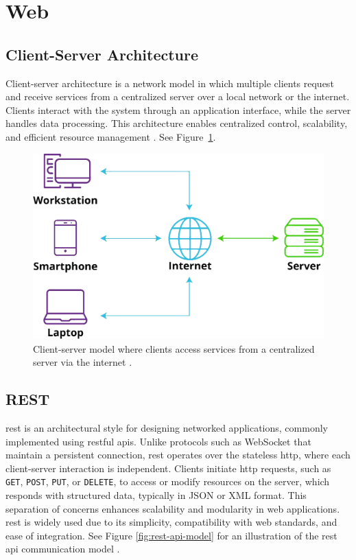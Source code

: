 \section{Web}
\label{sec:web}

\subsection{Client-Server Architecture}
\label{subsec:client-server}

Client-server architecture is a network model in which multiple clients request and receive services from a centralized server over a local network or the internet. Clients interact with the system through an application interface, while the server handles data processing. This architecture enables centralized control, scalability, and efficient resource management \cite{liquidweb:client-server}. See Figure~\ref{fig:client-server-architecture}.

\begin{figure}[h!]
    \centering
    \includegraphics[width=0.75\linewidth]{figures/theory/client-server-architecture.png}
    \caption[Client-server architecture]{Client-server model where clients access services from a centralized server via the internet \cite{liquidweb:client-server}.}
    \label{fig:client-server-architecture}
\end{figure}

\subsection{REST}

\gls{rest} is an architectural style for designing networked applications, commonly implemented using \gls{rest}ful \glspl{api}. Unlike protocols such as WebSocket that maintain a persistent connection, \gls{rest} operates over the stateless \gls{http}, where each client-server interaction is independent. Clients initiate \gls{http} requests, such as \texttt{GET}, \texttt{POST}, \texttt{PUT}, or \texttt{DELETE}, to access or modify resources on the server, which responds with structured data, typically in JSON or XML format. This separation of concerns enhances scalability and modularity in web applications. \gls{rest} is widely used due to its simplicity, compatibility with web standards, and ease of integration. See Figure \ref{fig:rest-api-model} for an illustration of the \gls{rest} \gls{api} communication model \cite{medium:rest}.

